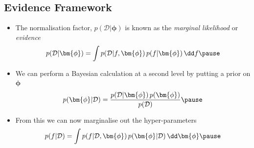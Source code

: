 
\begin{slide}
\section[-2]{Evidence Framework}

\begin{PauseHighLight}
  \begin{itemize}
  \item The normalisation factor, $p(\mathcal{D}|\bm{\phi})$ is known
    as the \emph{marginal likelihood} or \emph{evidence}
    \begin{align*}
      p(\mathcal{D}|\bm{\phi}) =
      \int p(\mathcal{D}| f, \bm{\phi})\, p(f|\bm{\phi}) \, \dd f\pause
    \end{align*}
  \item We can perform a Bayesian calculation at a second level by
    putting a prior on $\bm{\phi}$
    \begin{align*}
      p(\bm{\phi} | \mathcal{D}) = \frac{p(\mathcal{D}|\bm{\phi}) \,
      p(\bm{\phi})}{p(\mathcal{D})}\pause
    \end{align*}
  \item From this we can now marginalise out the hyper-parameters
    \begin{align*}
      p(f|\mathcal{D}) = \int
      p(f|\mathcal{D},\bm{\phi}) \, p(\bm{\phi} | \mathcal{D}) \,
      \dd \bm{\phi}\pause
    \end{align*}
  \end{itemize}
\end{PauseHighLight}

\end{slide}


